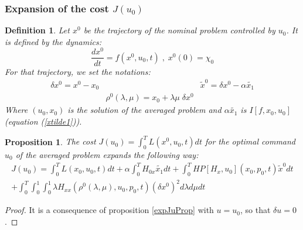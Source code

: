 \documentclass[a4paper,10pt]{article}
\newtheorem{definition}{Definition}
\newtheorem{proposition}{Proposition}
\begin{document}
\subsubsection{Expansion of the cost $J(u_{0})$}
\begin{definition}
    Let $x^{0}$ be the trajectory of the nominal problem controlled 
    by $u_{0}$. It is defined by the dynamics:
    \begin{equation}
    \frac{dx^{0}}{dt}=f(x^{0},u_{0},t) \; , \; x^{0}(0)=\chi_{0}
    \label{dynamicsu0}
\end{equation}
For that trajectory, we set the notations:
    \begin{eqnarray*}
        \delta x^{0} = x^{0}-x_{0} &  & \tilde{x}^{0} = \delta x^{0} - \alpha \tilde{x_{1}}\\
       & \rho^{0}(\lambda,\mu) = x_{0} + \lambda \mu \; \delta x^{0} &
    \end{eqnarray*}
    Where $(u_{0},x_{0})$ is the solution of the averaged problem and 
    $\alpha \tilde{x_{1}}$ is $I[f,x_{0},u_{0}]$ (equation (\ref{xtilde1})).
\end{definition}
\begin{proposition}\label{expJu0Prop}
    The cost $J(u_{0}) = \int_{0}^{T} L(x^{0},u_{0},t) dt$ for the 
    optimal command $u_{0}$ of the averaged problem 
    expands the following way:
    \begin{align}
        J(u_{0}) = \int_{0}^{T} L(x_{0},u_{0},t) dt
	+ \alpha \int_{0}^{T} H_{0x} \tilde{x_{1}} dt
	+ \int_{0}^{T} HP[H_{x},u_{0}](x_{0},p_{0},t) \tilde{x}^{0} dt 
	\nonumber \\
	+ \int_{0}^{T} \int_{0}^{1} \int_{0}^{1} 
	\lambda H_{xx}(\rho^{0}(\lambda,\mu),u_{0},p_{0},t)(\delta x^{0})^{2}  
	d \lambda d \mu dt
        \label{expJu0}
    \end{align}
\end{proposition}
\begin{proof}
    It is a consequence of proposition \ref{expJuProp} with $u=u_{0}$, 
    so that $\delta u = 0$.
\end{proof}
\end{document}
